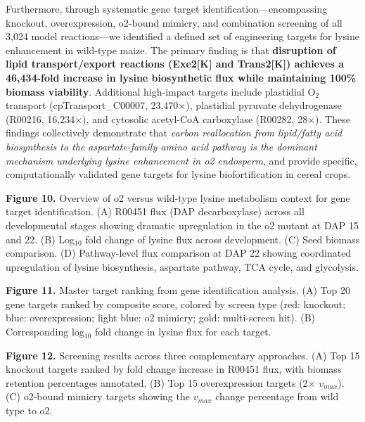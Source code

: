 Furthermore, through systematic gene target identification---encompassing knockout, overexpression, o2-bound mimicry, and combination screening of all 3,024 model reactions---we identified a defined set of engineering targets for lysine enhancement in wild-type maize. The primary finding is that \textbf{disruption of lipid transport/export reactions (Exe2[K] and Trans2[K]) achieves a 46,434-fold increase in lysine biosynthetic flux while maintaining 100\% biomass viability}. Additional high-impact targets include plastidial O$_2$ transport (cpTransport\_C00007, 23,470$\times$), plastidial pyruvate dehydrogenase (R00216, 16,234$\times$), and cytosolic acetyl-CoA carboxylase (R00282, 28$\times$). These findings collectively demonstrate that \textit{carbon reallocation from lipid/fatty acid biosynthesis to the aspartate-family amino acid pathway is the dominant mechanism underlying lysine enhancement in o2 endosperm}, and provide specific, computationally validated gene targets for lysine biofortification in cereal crops.


\textbf{Figure 10.} Overview of o2 versus wild-type lysine metabolism context for gene target identification. (A) R00451 flux (DAP decarboxylase) across all developmental stages showing dramatic upregulation in the o2 mutant at DAP 15 and 22. (B) Log$_{10}$ fold change of lysine flux across development. (C) Seed biomass comparison. (D) Pathway-level flux comparison at DAP 22 showing coordinated upregulation of lysine biosynthesis, aspartate pathway, TCA cycle, and glycolysis.
\label{fig:target_overview}

\textbf{Figure 11.} Master target ranking from gene identification analysis. (A) Top 20 gene targets ranked by composite score, colored by screen type (red: knockout; blue: overexpression; light blue: o2 mimicry; gold: multi-screen hit). (B) Corresponding log$_{10}$ fold change in lysine flux for each target.
\label{fig:target_ranking}

\textbf{Figure 12.} Screening results across three complementary approaches. (A) Top 15 knockout targets ranked by fold change increase in R00451 flux, with biomass retention percentages annotated. (B) Top 15 overexpression targets (2$\times$ $v_{max}$). (C) o2-bound mimicry targets showing the $v_{max}$ change percentage from wild type to o2.
\label{fig:screening_results}

